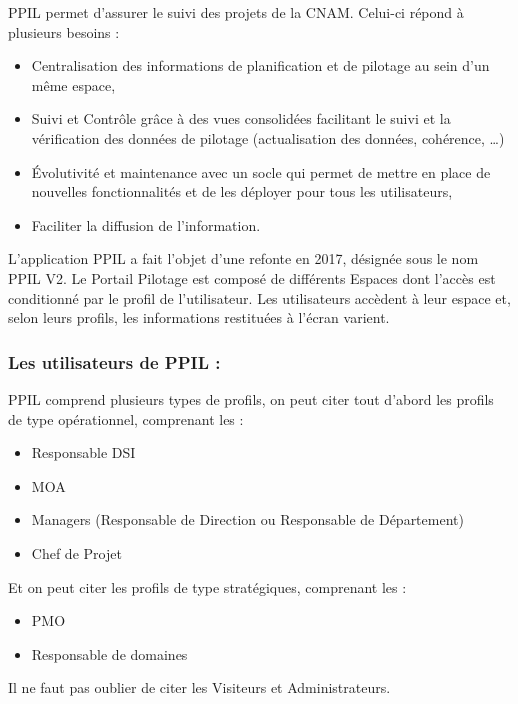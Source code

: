 PPIL permet d'assurer le suivi des projets de la CNAM.
Celui-ci répond à plusieurs besoins :
\begin{itemize}
    \item Centralisation des informations de planification et de pilotage  au sein d’un même espace,
    \item Suivi et Contrôle grâce à des vues consolidées facilitant le suivi et la vérification des données de pilotage (actualisation des données, cohérence, …)
    \item Évolutivité et maintenance avec un socle qui permet de mettre en place de nouvelles fonctionnalités et de les déployer pour tous les utilisateurs,
    \item Faciliter la diffusion de l’information.
\end{itemize}
L'application PPIL a fait l'objet d'une refonte en 2017, désignée sous le nom PPIL V2. 
Le Portail Pilotage est composé de différents Espaces dont l’accès est conditionné par le profil de l’utilisateur. Les utilisateurs accèdent à leur espace et, selon leurs profils, les informations restituées à l’écran varient.

\subsubsection{Les utilisateurs de PPIL :}
PPIL comprend plusieurs types de profils, on peut citer tout d'abord les profils de type opérationnel, comprenant les : 
\begin{itemize}
    \item Responsable DSI
    \item MOA
    \item Managers (Responsable de Direction ou Responsable de Département) 
    \item Chef de Projet
\end{itemize}
Et on peut citer les profils de type stratégiques, comprenant les :
\begin{itemize}
    \item PMO
    \item Responsable de domaines
\end{itemize}
\vspace{\baselineskip}
Il ne faut pas oublier de citer les Visiteurs et Administrateurs.


